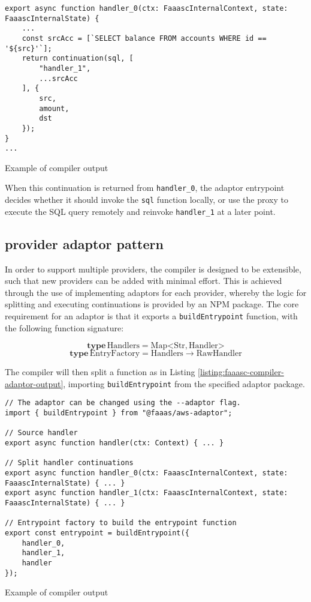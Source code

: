 \begin{listing}[H]
\begin{verbatim}
export async function handler_0(ctx: FaaascInternalContext, state: FaaascInternalState) {
    ...
    const srcAcc = [`SELECT balance FROM accounts WHERE id == '${src}'`];
    return continuation(sql, [
        "handler_1",
        ...srcAcc
    ], {
        src,
        amount,
        dst
    });
}
...
\end{verbatim}
\caption{Example of \faaasc{} compiler output}
\label{listing:faaasc-compiler-handler-ret-continuation}
\end{listing}

When this continuation is returned from \verb|handler_0|, the adaptor entrypoint decides whether it should invoke the \verb|sql| function locally, or use the proxy to execute the SQL query remotely and reinvoke \verb|handler_1| at a later point.

\subsection{\faas{} provider adaptor pattern}
In order to support multiple \faas{} providers, the \faaasc{} compiler is designed to be extensible, such that new providers can be added with minimal effort. This is achieved through the use of implementing adaptors for each \faas{} provider, whereby the logic for splitting and executing continuations is provided by an NPM package. The core requirement for an adaptor is that it exports a \verb|buildEntrypoint| function, with the following function signature:

\begin{signature}
$$\textbf{type}\, \textrm{Handlers} = \textrm{Map}\mathord{<}\textrm{Str}, \textrm{Handler}\mathord{>}$$
$$\textbf{type}\, \textrm{EntryFactory} = \textrm{Handlers} \rightarrow \textrm{RawHandler}$$
\end{signature}

The \faaasc{} compiler will then split a function as in Listing \ref{listing:faaasc-compiler-adaptor-output}, importing \verb|buildEntrypoint| from the specified adaptor package.

\begin{listing}[H]
\begin{verbatim}
// The adaptor can be changed using the --adaptor flag.
import { buildEntrypoint } from "@faaas/aws-adaptor";

// Source handler
export async function handler(ctx: Context) { ... }

// Split handler continuations
export async function handler_0(ctx: FaaascInternalContext, state: FaaascInternalState) { ... }
export async function handler_1(ctx: FaaascInternalContext, state: FaaascInternalState) { ... }

// Entrypoint factory to build the entrypoint function
export const entrypoint = buildEntrypoint({
    handler_0,
    handler_1,
    handler
});
\end{verbatim}
\caption{Example of \faaasc{} compiler output}
\label{listing:faaasc-compiler-adaptor-output}
\end{listing}

